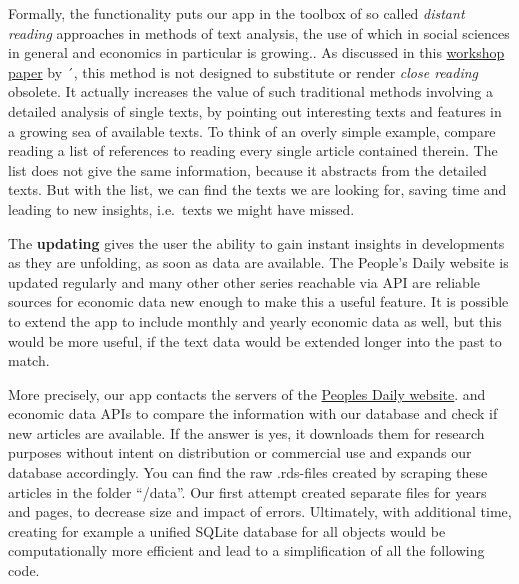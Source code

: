 \documentclass[12pt,a4paper]{article}
\begin{document}
Formally, the functionality puts our app in the toolbox of so called \emph{distant reading} approaches in methods of text analysis, the use of which in social sciences in general and economics in particular is growing.. As discussed in this \href{http://ceur-ws.org/Vol-1786/scrivner.pdf}{workshop paper} by \textcite{scrivner_davis2017}´, this method is not designed to substitute or render \emph{close reading} obsolete. It actually increases the value of such traditional methods involving a detailed analysis of single texts, by pointing out interesting texts and features in a growing sea of available texts. To think of an overly simple example, compare reading a list of references to reading every single article contained therein. The list does not give the same information, because it abstracts from the detailed texts. But with the list, we can find the texts we are looking for, saving time and leading to new insights, i.e.~texts we might have missed.

The \textbf{updating} gives the user the ability to gain instant insights in developments as they are unfolding, as soon as data are available. The People's Daily website is updated regularly and many other other series reachable via API are reliable sources for economic data new enough to make this a useful feature. It is possible to extend the app to include monthly and yearly economic data as well, but this would be more useful, if the text data would be extended longer into the past to match.

More precisely, our app contacts the servers of the \href{http://paper.people.com.cn/rmrb}{Peoples Daily website}. and economic data APIs to compare the information with our database and check if new articles are available. If the answer is yes, it downloads them for research purposes without intent on distribution or commercial use and expands our database accordingly. You can find the raw .rds-files created by scraping these articles in the folder \enquote{/data}. Our first attempt created separate files for years and pages, to decrease size and impact of errors. Ultimately, with additional time, creating for example a unified SQLite database for all objects would be computationally more efficient and lead to a simplification of all the following code.
\end{document}
